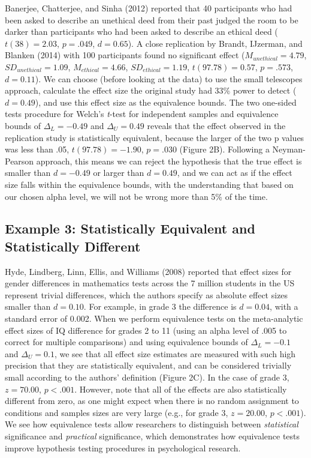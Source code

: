 \documentclass[english,floatsintext,man]{apa6}
\newcounter{author}
\theoremstyle{definition}
\theoremstyle{definition}
\theoremstyle{definition}
\theoremstyle{remark}
\begin{document}
Banerjee, Chatterjee, and Sinha (2012) reported that 40 participants who
had been asked to describe an unethical deed from their past judged the
room to be darker than participants who had been asked to describe an
ethical deed (\(t(38)= 2.03\), \(p= .049\), \(d= 0.65\)). A close
replication by Brandt, IJzerman, and Blanken (2014) with 100
participants found no significant effect (\(M_{unethical}= 4.79\),
\({SD}_{unethical}= 1.09\), \(M_{ethical}=4.66\),
\({SD}_{ethical}=1.19\), \(t(97.78)=0.57\), \(p=.573\), \(d=0.11\)). We
can choose (before looking at the data) to use the small telescopes
approach, calculate the effect size the original study had 33\% power to
detect (\(d = 0.49\)), and use this effect size as the equivalence
bounds. The two one-sided tests procedure for Welch's \emph{t}-test for
independent samples and equivalence bounds of \({\Delta}_L=-0.49\) and
\({\Delta}_U=0.49\) reveals that the effect observed in the replication
study is statistically equivalent, because the larger of the two p
values was less than .05, \(t(97.78)=-1.90\), \(p=.030\) (Figure 2B).
Following a Neyman-Pearson approach, this means we can reject the
hypothesis that the true effect is smaller than \(d = -0.49\) or larger
than \(d = 0.49\), and we can act as if the effect size falls within the
equivalence bounds, with the understanding that based on our chosen
alpha level, we will not be wrong more than 5\% of the time.

\subsection{Example 3: Statistically Equivalent and Statistically
Different}\label{example-3-statistically-equivalent-and-statistically-different}

Hyde, Lindberg, Linn, Ellis, and Williams (2008) reported that effect
sizes for gender differences in mathematics tests across the 7 million
students in the US represent trivial differences, which the authors
specify as absolute effect sizes smaller than \(d = 0.10\). For example,
in grade 3 the difference is \(d = 0.04\), with a standard error of
0.002. When we perform equivalence tests on the meta-analytic effect
sizes of IQ difference for grades 2 to 11 (using an alpha level of .005
to correct for multiple comparisons) and using equivalence bounds of
\(\Delta_{L} = -0.1\) and \(\Delta_{U} = 0.1\), we see that all effect
size estimates are measured with such high precision that they are
statistically equivalent, and can be considered trivially small
according to the authors' definition (Figure 2C). In the case of grade
3, \(z = 70.00\), \(p < .001\). However, note that all of the effects
are also statistically different from zero, as one might expect when
there is no random assignment to conditions and samples sizes are very
large (e.g., for grade 3, \(z = 20.00\), \(p < .001\)). We see how
equivalence tests allow researchers to distinguish between
\emph{statistical} significance and \emph{practical} significance, which
demonstrates how equivalence tests improve hypothesis testing procedures
in psychological research.
\end{document}
